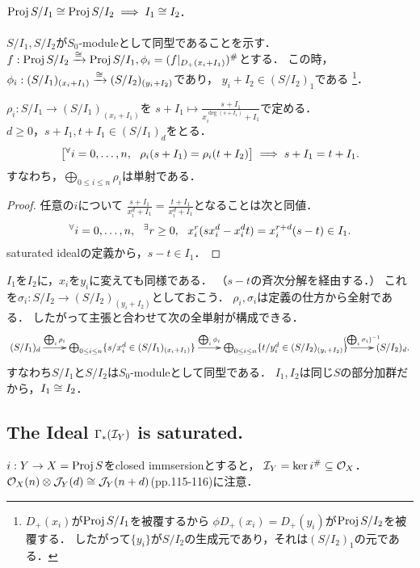 \documentclass[a4paper]{jsarticle}
\begin{document}
    \paragraph{$\operatorname{Proj} S/I_1 \cong \operatorname{Proj} S/I_2 \implies I_1 \cong I_2$.}
    $S/I_1, S/I_2$が$S_0$-moduleとして同型であることを示す．
    $f: \operatorname{Proj} S/I_2 \xrightarrow{\cong} \operatorname{Proj} S/I_1, \phi_i=(f|_{D_+(x_i+I_1)})^{\#}$とする．
    この時，$\phi_i: (S/I_1)_{(x_i+I_1)} \xrightarrow{\cong} (S/I_2)_{(y_i+I_2)}$であり，
    $y_i+I_2 \in (S/I_2)_1$である
    \footnote
    {
        $D_+(x_i)$が$\operatorname{Proj} S/I_1$を被覆するから
        $\phi D_+(x_i)=D_+(y_i)$が$\operatorname{Proj} S/I_2$を被覆する．
        したがって$\{y_i\}$が$S/I_2$の生成元であり，それは$(S/I_2)_1$の元である．
    }．
    \begin{Claim}
        $\rho_i: S/I_1 \to (S/I_1)_{(x_i+I_1)}$を
        $s+I_1 \mapsto \frac{s+I_1}{x_i^{\deg (s+I_1)}+I_1}$で定める．
        $d \geq 0，s+I_1, t+I_1 \in (S/I_1)_d$をとる．
        \[
            \left[ {}^{\forall} i=0,\dots,n,~~ \rho_i(s+I_1)=\rho_i(t+I_2) \right]
                \implies s+I_1=t+I_1.
        \]
        すなわち，$\bigoplus_{0 \leq i \leq n} \rho_i$は単射である．
    \end{Claim}
    \begin{proof}
        任意の$i$について
        $\frac{s+I_1}{x_i^d+I_1}=\frac{t+I_1}{x_i^d+I_1}$となることは次と同値．
        \[ {}^{\forall} i=0,\dots,n,~~ {}^{\exists} r \geq 0,~~ x_i^r(s x_i^d-x_i^d t)=x_i^{r+d}(s-t) \in I_1. \]
        saturated idealの定義から，$s-t \in I_1$．
    \end{proof}
    $I_1$を$I_2$に，$x_i$を$y_i$に変えても同様である．
    （$s-t$の斉次分解を経由する．）
    これを$\sigma_i: S/I_2 \to (S/I_2)_{(y_i+I_2)}$としておこう．
    $\rho_i, \sigma_i$は定義の仕方から全射である．
    したがって主張と合わせて次の全単射が構成できる．
    \[
        \xymatrix
        {
            (S/I_1)_d \ar[r]^-{\bigoplus_i \rho_i}&
            \bigoplus_{0 \leq i \leq n} \{ s/x_i^d \in (S/I_1)_{(x_i+I_1)} \} \ar[r]^-{\bigoplus_i \phi_i}&
            \bigoplus_{0 \leq i \leq n} \{ t/y_i^d \in (S/I_2)_{(y_i+I_2)} \} \ar[r]^-{(\bigoplus_i \sigma_i)^{-1}}&
            (S/I_2)_d.
        }
    \]
    すなわち$S/I_1$と$S/I_2$は$S_0$-moduleとして同型である．
    $I_1, I_2$は同じ$S$の部分加群だから，$I_1 \cong I_2$．

    \subsection{The Ideal $\Gamma_*(\mathcal{I}_Y)$ is saturated.}
    $i: Y \to X=\operatorname{Proj} S$をclosed immsersionとすると，
    $\mathcal{I}_Y=\ker i^{\#} \subseteq \mathcal{O}_X$．
    $\mathcal{O}_X(n) \otimes \mathcal{J}_Y(d) \cong \mathcal{J}_Y(n+d)$(pp.115-116)に注意．
\end{document}
